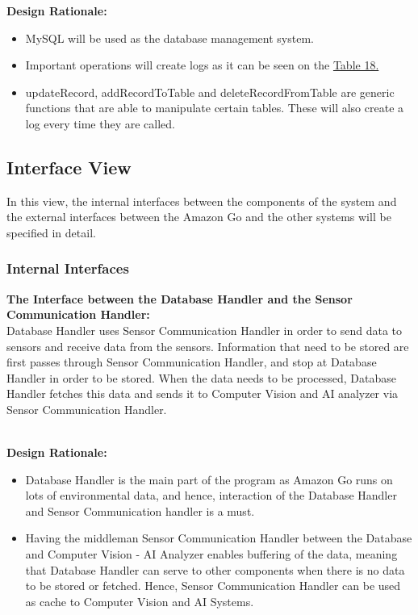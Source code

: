 \documentclass[11pt]{article}
\begin{document}
    \textbf{Design Rationale:\\}
    \begin{itemize}
        \item MySQL will be used as the database management system.
        \item Important operations will create logs as it can be seen on the \hyperref[CRUD]{Table 18.}
        \item updateRecord, addRecordToTable and deleteRecordFromTable are generic functions that are able to manipulate certain tables. These will also create a log every time they are called.
    \end{itemize}


    \subsection{Interface View}
    In this view, the internal interfaces between the components of the system and the external interfaces between the 
    Amazon Go and the other systems will be specified in detail.

    
    \subsubsection{Internal Interfaces}
    \textbf{The Interface between the Database Handler and the Sensor Communication Handler:\\}
    Database Handler uses Sensor Communication Handler in order to send data to sensors and receive data from the sensors. Information that need to be stored are first passes
    through Sensor Communication Handler, and stop at Database Handler in order to be stored. When the data needs to be processed, Database Handler fetches this data
    and sends it to Computer Vision and AI analyzer via Sensor Communication Handler. 
    
    \textbf{\\Design Rationale:}
    \begin{itemize}
        \item  Database Handler is the main part of the program as Amazon Go runs on lots of environmental data, and hence, interaction of the Database Handler and
        Sensor Communication handler is a must.
        \item Having the middleman Sensor Communication Handler between the Database and Computer Vision - AI Analyzer enables buffering of the data, meaning that 
            Database Handler can serve to other components when there is no data to be stored or fetched. Hence, Sensor Communication Handler can be used as cache to Computer
            Vision and AI Systems.
    \end{itemize}
    
\end{document}
